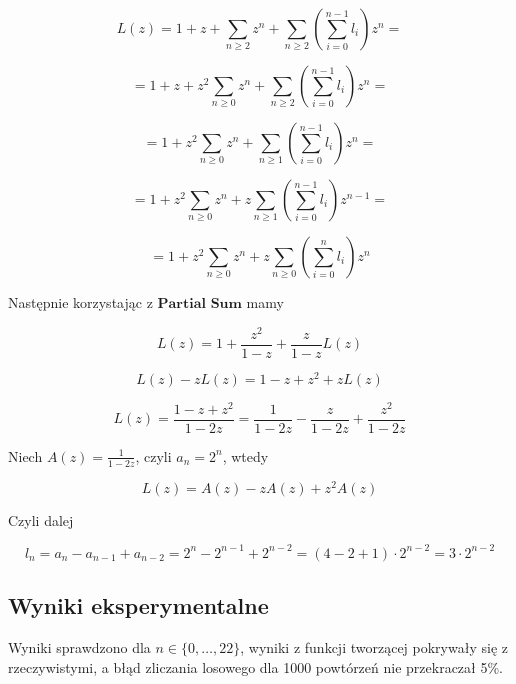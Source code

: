 \documentclass{article}
\begin{document}
\[L(z) = 1 + z + \sum\limits_{n \geq 2}{z^n} + \sum\limits_{n \geq 2}{\left(\sum\limits_{i = 0}^{n-1}{l_i}\right)z^n} =\]

\[= 1 + z + z^2\sum\limits_{n \geq 0}{z^n} + \sum\limits_{n \geq 2}{\left(\sum\limits_{i = 0}^{n-1}{l_i}\right)z^n} =\]

\[= 1 + z^2\sum\limits_{n \geq 0}{z^n} + \sum\limits_{n \geq 1}{\left(\sum\limits_{i = 0}^{n-1}{l_i}\right)z^n} =\]

\[= 1 + z^2\sum\limits_{n \geq 0}{z^n} + z\sum\limits_{n \geq 1}{\left(\sum\limits_{i = 0}^{n-1}{l_i}\right)z^{n-1}} =\]

\[= 1 + z^2\sum\limits_{n \geq 0}{z^n} + z\sum\limits_{n \geq 0}{\left(\sum\limits_{i = 0}^{n}{l_i}\right)z^n}\]

Następnie korzystając z $\textbf{Partial Sum}$ mamy

\[L(z) = 1 + \frac{z^2}{1-z} + \frac{z}{1-z}L(z)\]

\[L(z) - zL(z) = 1 - z + z^2 + zL(z)\]

\[L(z) = \frac{1-z+z^2}{1-2z} = \frac{1}{1-2z} - \frac{z}{1-2z} + \frac{z^2}{1-2z}\]

Niech $A(z) = \frac{1}{1-2z}$, czyli $a_n = 2^n$, wtedy

\[L(z) = A(z) - zA(z) + z^2A(z)\]

Czyli dalej

\[l_n = a_n - a_{n-1} + a_{n-2} = 2^n - 2^{n-1} + 2^{n-2} = (4-2+1) \cdot 2^{n-2} = 3 \cdot 2^{n-2}\]

\subsection{Wyniki eksperymentalne}

Wyniki sprawdzono dla $n \in \{0,\dots,22\}$, wyniki z funkcji tworzącej pokrywały się z rzeczywistymi, a błąd zliczania losowego dla 1000 powtórzeń nie przekraczał 5\%.
\end{document}
